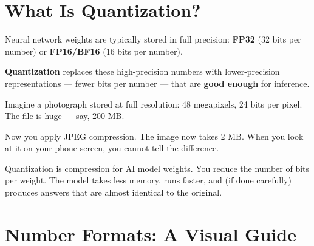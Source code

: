 \documentclass[11pt, twoside, openright]{book}
\newcommand{\analogybox}[2]{\begin{tcolorbox}[analogystyle, title={Analogy: #1}]#2\end{tcolorbox}}
\newcommand{\keyterm}[1]{\textbf{\color{AccentOrange}#1}}
\begin{document}
\section{What Is Quantization?}

Neural network weights are typically stored in full precision:
\textbf{FP32} (32 bits per number) or \textbf{FP16/BF16} (16 bits per number).

\keyterm{Quantization} replaces these high-precision numbers
with lower-precision representations --- fewer bits per number --- that are
\textbf{good enough} for inference.

\analogybox{The Photo Compression Analogy}{
Imagine a photograph stored at full resolution: 48 megapixels, 24 bits per pixel.
The file is huge --- say, 200 MB.

Now you apply JPEG compression.  The image now takes 2 MB.  When you look at it
on your phone screen, you cannot tell the difference.

Quantization is compression for AI model weights.  You reduce the number of bits
per weight.  The model takes less memory, runs faster, and (if done carefully)
produces answers that are almost identical to the original.
}

\section{Number Formats: A Visual Guide}
\end{document}
